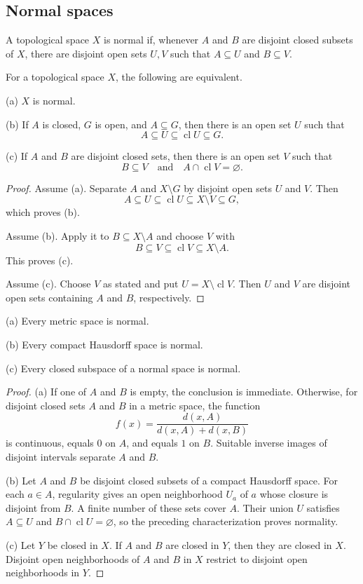 \subsection{Normal spaces}

\begin{de}
A topological space $X$ is normal if, whenever $A$ and $B$ are disjoint closed
subsets of $X$, there are disjoint open sets $U,V$ such that $A\subseteq U$
and $B\subseteq V$.
\end{de}

\begin{thm}
For a topological space $X$, the following are equivalent.

(a) $X$ is normal.

(b) If $A$ is closed, $G$ is open, and $A\subseteq G$, then there is an open
set $U$ such that
\[
A\subseteq U\subseteq\operatorname{cl}U\subseteq G.
\]

(c) If $A$ and $B$ are disjoint closed sets, then there is an open set $V$
such that
\[
B\subseteq V
\quad\text{and}\quad
A\cap\operatorname{cl}V=\varnothing.
\]
\end{thm}

\begin{proof}
Assume (a). Separate $A$ and $X\setminus G$ by disjoint open sets $U$ and
$V$. Then
\[
A\subseteq U\subseteq\operatorname{cl}U
\subseteq X\setminus V\subseteq G,
\]
which proves (b).

Assume (b). Apply it to $B\subseteq X\setminus A$ and choose $V$ with
\[
B\subseteq V\subseteq\operatorname{cl}V\subseteq X\setminus A.
\]
This proves (c).

Assume (c). Choose $V$ as stated and put
$U=X\setminus\operatorname{cl}V$. Then $U$ and $V$ are disjoint open sets
containing $A$ and $B$, respectively.
\end{proof}

\begin{thm}
(a) Every metric space is normal.

(b) Every compact Hausdorff space is normal.

(c) Every closed subspace of a normal space is normal.
\end{thm}

\begin{proof}
(a) If one of $A$ and $B$ is empty, the conclusion is immediate. Otherwise,
for disjoint closed sets $A$ and $B$ in a metric space, the function
\[
f(x)=\frac{d(x,A)}{d(x,A)+d(x,B)}
\]
is continuous, equals $0$ on $A$, and equals $1$ on $B$. Suitable inverse
images of disjoint intervals separate $A$ and $B$.

(b) Let $A$ and $B$ be disjoint closed subsets of a compact Hausdorff space.
For each $a\in A$, regularity gives an open neighborhood $U_a$ of $a$ whose
closure is disjoint from $B$. A finite number of these sets cover $A$. Their
union $U$ satisfies $A\subseteq U$ and
$B\cap\operatorname{cl}U=\varnothing$, so the preceding characterization
proves normality.

(c) Let $Y$ be closed in $X$. If $A$ and $B$ are closed in $Y$, then they are
closed in $X$. Disjoint open neighborhoods of $A$ and $B$ in $X$ restrict to
disjoint open neighborhoods in $Y$.
\end{proof}

